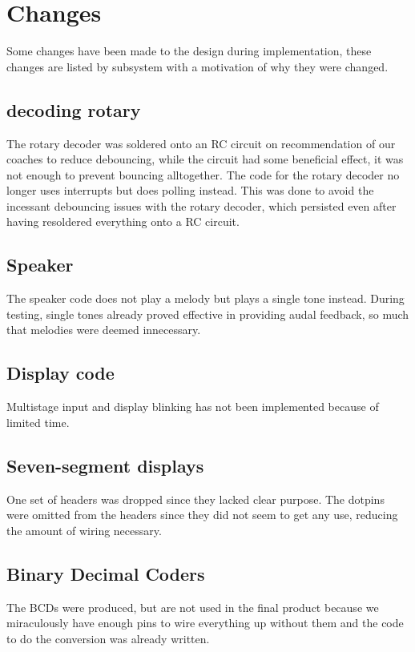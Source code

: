 \chapter{Changes}

Some changes have been made to the design during implementation, these changes are listed by subsystem with a motivation of why they were changed.

\section{decoding rotary}
The rotary decoder was soldered onto an RC circuit on recommendation of our coaches to reduce debouncing, while the circuit had some beneficial effect, it was not enough to prevent bouncing alltogether.
The code for the rotary decoder no longer uses interrupts but does polling instead.
This was done to avoid the incessant debouncing issues with the rotary decoder, which persisted even after having resoldered everything onto a RC circuit.

\section{Speaker}
The speaker code does not play a melody but plays a single tone instead.
During testing, single tones already proved effective in providing audal feedback, so much that melodies were deemed innecessary.

\section{Display code}
Multistage input and display blinking has not been implemented because of limited time.

\section{Seven-segment displays}
One set of headers was dropped since they lacked clear purpose.
The dotpins were omitted from the headers since they did not seem to get any use, reducing the amount of wiring necessary.

\section{Binary Decimal Coders}
The BCDs were produced, but are not used in the final product because we miraculously have enough pins to wire everything up without them and the code to do the conversion was already written.

